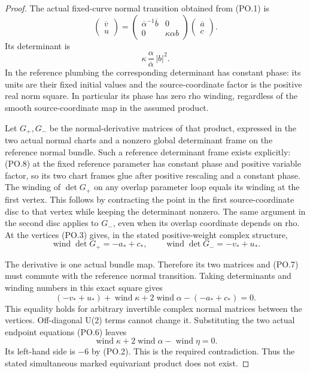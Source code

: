 \begin{proof}
The actual fixed-curve normal transition obtained from (PO.1) is
\[
 \begin{pmatrix}\overline v\\u\end{pmatrix}
 =\begin{pmatrix}
       \overline\alpha^{-1}\overline b&0\\
       0&\kappa\alpha b
   \end{pmatrix}
   \begin{pmatrix}\overline a\\c\end{pmatrix}.
                                                               \tag{PO.7}
\]
Its determinant is
\[
              \kappa\,\frac\alpha{\overline\alpha}\,|b|^2.
                                                               \tag{PO.8}
\]
In the reference plumbing the corresponding determinant has constant
phase: its units are their fixed initial values and the source-coordinate
factor is the positive real norm square. In particular its phase has
zero rho winding, regardless of the smooth source-coordinate map in
the assumed product.

Let \(G_+,G_-\) be the normal-derivative matrices of that product,
expressed in the two actual normal charts and a nonzero global
determinant frame on the reference normal bundle. Such a reference
determinant frame exists explicitly: (PO.8) at the fixed reference
parameter has constant phase and positive variable factor, so its
two chart frames glue after positive rescaling and a constant phase.
The winding of \(\det G_+\) on any overlap parameter loop equals
its winding at the first vertex. This follows by contracting the
point in the first source-coordinate disc to that vertex while
keeping the determinant nonzero. The same argument in the second
disc applies to \(G_-\), even when its overlap coordinate depends
on rho. At the vertices (PO.3) gives, in the stated positive-weight
complex structure,
\[
 \operatorname{wind}\det G_+=-a_*+c_*,\qquad
 \operatorname{wind}\det G_-= -v_*+u_* .             \tag{PO.9}
\]

The derivative is one actual bundle map. Therefore its two matrices
and (PO.7) must commute with the reference normal transition. Taking
determinants and winding numbers in this exact square gives
\[
 (-v_*+u_*)+\operatorname{wind}\kappa
             +2\operatorname{wind}\alpha
                     -(-a_*+c_*)=0.                   \tag{PO.10}
\]
This equality holds for arbitrary invertible complex normal matrices
between the vertices. Off-diagonal U(2) terms cannot change it.
Substituting the two actual endpoint equations (PO.6) leaves
\[
 \operatorname{wind}\kappa+2\operatorname{wind}\alpha
                     -\operatorname{wind}\eta=0.       \tag{PO.11}
\]
Its left-hand side is \(-6\) by (PO.2). This is the required
contradiction. Thus the stated simultaneous marked equivariant
product does not exist.


\end{proof}
